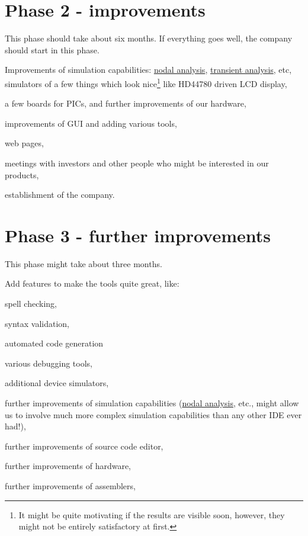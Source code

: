 \documentclass[a4paper,twoside,15pt]{book}
\begin{document}
    \section{Phase 2 - improvements}
        This phase should take about six months. If everything goes well, the company should start in this phase.
        \begin{dinglist}{73}
            \item Improvements of simulation capabilities: \href{http://www.ecircuitcenter.com/SpiceTopics/Nodal Analysis/Nodal Analysis.htm}{nodal analysis}, \href{http://www.ecircuitcenter.com/SpiceTopics/Transient Analysis/Transient Analysis.htm}{transient analysis}, etc, simulators of a few things which look nice\footnote{It might be quite motivating if the results are visible soon, however, they might not be entirely satisfactory at first.} like HD44780 driven LCD display,
            \item a few boards for PICs, and further improvements of our hardware,
            \item improvements of GUI and adding various tools,
            \item web pages,
            \item meetings with investors and other people who might be interested in our products,
            \item establishment of the company.
        \end{dinglist}

    \section{Phase 3 - further improvements}
        This phase might take about three months.
        \begin{dinglist}{73}
            \item Add features to make the tools quite great, like:
                \begin{dinglist}{75}
                    \item spell checking,
                    \item syntax validation,
                    \item automated code generation
                    \item various debugging tools,
                    \item additional device simulators,
                    \item further improvements of simulation capabilities (\href{http://en.wikipedia.org/wiki/Nodal_analysis}{nodal analysis}, etc., might allow us to involve much more complex simulation capabilities than any other IDE ever had!),
                    \item further improvements of source code editor,
                    \item further improvements of hardware,
                    \item further improvements of assemblers,
                \end{dinglist}
        \end{dinglist}
\end{document}
